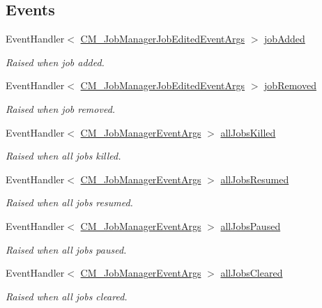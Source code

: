 \subsection*{Events}
\begin{DoxyCompactItemize}
\item 
Event\+Handler$<$ \hyperlink{class_c_m___job_manager_job_edited_event_args}{C\+M\+\_\+\+Job\+Manager\+Job\+Edited\+Event\+Args} $>$ \hyperlink{class_c_m___job_manager_a0f3c4dff8b782e1b64abcbb7dc19cd8a}{job\+Added}
\begin{DoxyCompactList}\small\item\em Raised when job added. \end{DoxyCompactList}\item 
Event\+Handler$<$ \hyperlink{class_c_m___job_manager_job_edited_event_args}{C\+M\+\_\+\+Job\+Manager\+Job\+Edited\+Event\+Args} $>$ \hyperlink{class_c_m___job_manager_a3a24d267ce0e6a09a2cf8f13429f2b73}{job\+Removed}
\begin{DoxyCompactList}\small\item\em Raised when job removed. \end{DoxyCompactList}\item 
Event\+Handler$<$ \hyperlink{class_c_m___job_manager_event_args}{C\+M\+\_\+\+Job\+Manager\+Event\+Args} $>$ \hyperlink{class_c_m___job_manager_ac17ba0c89adf4dfa61d6b099f8029fa6}{all\+Jobs\+Killed}
\begin{DoxyCompactList}\small\item\em Raised when all jobs killed. \end{DoxyCompactList}\item 
Event\+Handler$<$ \hyperlink{class_c_m___job_manager_event_args}{C\+M\+\_\+\+Job\+Manager\+Event\+Args} $>$ \hyperlink{class_c_m___job_manager_a485232e2c1fe7cef56a53c20f74b638f}{all\+Jobs\+Resumed}
\begin{DoxyCompactList}\small\item\em Raised when all jobs resumed. \end{DoxyCompactList}\item 
Event\+Handler$<$ \hyperlink{class_c_m___job_manager_event_args}{C\+M\+\_\+\+Job\+Manager\+Event\+Args} $>$ \hyperlink{class_c_m___job_manager_a0dd6f2e0e4c7ead23dd25df03e23ddcb}{all\+Jobs\+Paused}
\begin{DoxyCompactList}\small\item\em Raised when all jobs paused. \end{DoxyCompactList}\item 
Event\+Handler$<$ \hyperlink{class_c_m___job_manager_event_args}{C\+M\+\_\+\+Job\+Manager\+Event\+Args} $>$ \hyperlink{class_c_m___job_manager_a292061e968b70d3271715d7a1c702db1}{all\+Jobs\+Cleared}
\begin{DoxyCompactList}\small\item\em Raised when all jobs cleared. \end{DoxyCompactList}\end{DoxyCompactItemize}
